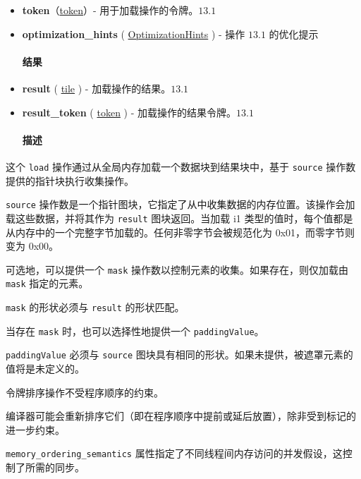 \documentclass{article}
\begin{document}
\begin{itemize}
\item \textbf{token}（\href{https://docs.nvidia.com/cuda/tile-ir/latest/sections/operations.html#type-token}{token}）- 用于加载操作的令牌。$\boxed{13.1}$
\item \textbf{optimization\_hints} ( \href{https://docs.nvidia.com/cuda/tile-ir/latest/sections/operations.html#op-attribute-cuda-tile-load-ptr-tko-optimizationhints-attr}{OptimizationHints} ) - 操作 $\boxed{13.1}$ 的优化提示


\paragraph{结果}

\item \textbf{result} ( \href{https://docs.nvidia.com/cuda/tile-ir/latest/sections/types.html#type-tile}{tile} ) - 加载操作的结果。$\boxed{13.1}$
\item \textbf{result\_token} ( \href{https://docs.nvidia.com/cuda/tile-ir/latest/sections/operations.html#type-token}{token} ) - 加载操作的结果令牌。$\boxed{13.1}$


\paragraph{描述}

\end{itemize}
这个 \texttt{load} 操作通过从全局内存加载一个数据块到结果块中，基于 \texttt{source} 操作数提供的指针块执行收集操作。


\texttt{source} 操作数是一个指针图块，它指定了从中收集数据的内存位置。该操作会加载这些数据，并将其作为 \texttt{result} 图块返回。当加载 i1 类型的值时，每个值都是从内存中的一个完整字节加载的。任何非零字节会被规范化为 0x01，而零字节则变为 0x00。


可选地，可以提供一个 \texttt{mask} 操作数以控制元素的收集。如果存在，则仅加载由 \texttt{mask} 指定的元素。

\texttt{mask} 的形状必须与 \texttt{result} 的形状匹配。


当存在 \texttt{mask} 时，也可以选择性地提供一个 \texttt{paddingValue}。

\texttt{paddingValue} 必须与 \texttt{source} 图块具有相同的形状。如果未提供，被遮罩元素的值将是未定义的。


令牌排序操作不受程序顺序的约束。

编译器可能会重新排序它们（即在程序顺序中提前或延后放置），除非受到标记的进一步约束。


\texttt{memory\_ordering\_semantics} 属性指定了不同线程间内存访问的并发假设，这控制了所需的同步。
\end{document}

